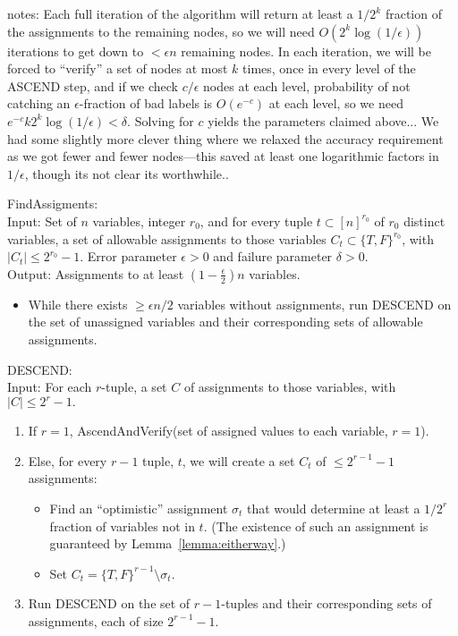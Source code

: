 \documentclass[anon,12pt]{colt2018}
\newcommand{\eps}{\epsilon}
\begin{document}
notes:  Each full iteration of the algorithm will return at least a $1/2^k$ fraction of the assignments to the remaining nodes, so we will need $O(2^k \log (1/\eps))$ iterations to get down to $<\eps n$ remaining nodes.  In each iteration, we will be forced to ``verify'' a set of nodes at most $k$ times, once in every level of the ASCEND step, and if we check $c/\eps$ nodes at each level, probability of not catching an $\eps$-fraction of bad labels is $O(e^{-c})$ at each level, so we need $e^{-c}k2^k\log(1/\eps) < \delta.$  Solving for $c$ yields the parameters claimed above...   We had some slightly more clever thing where we relaxed the accuracy requirement as we got fewer and fewer nodes---this saved at least one logarithmic factors in $1/\eps$, though its not clear its worthwhile..

\fi

\begin{algorithm}
FindAssigments:\\
Input: Set of $n$ variables, integer $r_0$, and for every tuple $t \subset [n]^{r_0}$ of $r_0$ distinct variables, a set of allowable assignments to those variables $C_t \subset \{T,F\}^{r_0}$, with $|C_t| \le 2^{r_0} -1.$  Error parameter $\eps>0$ and failure parameter $\delta> 0$.\\
Output: Assignments to at least $(1-\frac{\eps}{2})n$ variables.
\begin{itemize}
\item While there exists $\ge \eps n/2$ variables without assignments, run DESCEND on the set of unassigned variables and their corresponding sets of allowable assignments.
\end{itemize}
\end{algorithm}


\begin{algorithm}[H]
DESCEND:\\
Input: For each $r$-tuple, a set $C$ of assignments to those variables, with $|C| \le 2^r -1.$
\begin{enumerate}
\vspace{-.2cm}\item If $r=1$, AscendAndVerify(set of assigned values to each variable, $r=1$).
\vspace{-.2cm}\item Else, for every $r-1$ tuple, $t$, we will create a set $C_t$ of $\le 2^{r-1}-1$ assignments:
\begin{itemize}
\vspace{-.2cm}\item Find an ``optimistic'' assignment $\sigma_t$ that would determine at least a $1/2^r$ fraction of variables not in $t$.  (The existence of such an assignment is guaranteed by Lemma~\ref{lemma:eitherway}.)
\item Set $C_t = \{T,F\}^{r-1} \setminus \sigma_t.$
\end{itemize}
\item Run DESCEND on the set of $r-1$-tuples and their corresponding sets of assignments, each of size $2^{r-1}-1$.
\end{enumerate}
\end{algorithm}
\end{document}
